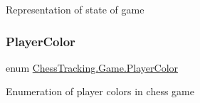 Representation of state of game 

\mbox{\label{namespace_chess_tracking_1_1_game_ab79070a55977a8c8326e9cdda7dcfa9a}} 
\subsubsection{\texorpdfstring{PlayerColor}{PlayerColor}}
{\footnotesize\ttfamily enum \mbox{\hyperlink{namespace_chess_tracking_1_1_game_ab79070a55977a8c8326e9cdda7dcfa9a}{Chess\+Tracking.\+Game.\+Player\+Color}}\hspace{0.3cm}{\ttfamily [strong]}}



Enumeration of player colors in chess game 

